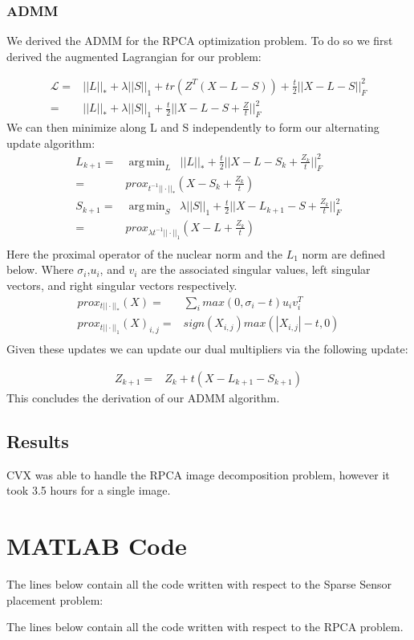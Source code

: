 \documentclass[12pt, letterpaper]{article}
\DeclareMathOperator*{\argmin}{arg\,min}
\begin{document}
	\subsubsection{ADMM}
		We derived the ADMM for the RPCA optimization problem. To do so we first derived the augmented Lagrangian for our problem:
	
	\begin{align*}
		\mathcal{L} =& ||L||_{*} + \lambda||S||_{1} +	tr(Z^T(X-L-S))+ \frac{t}{2}||X-L-S||_{F}^{2} \\
		=& ||L||_{*} + \lambda||S||_{1} +\frac{t}{2}||X-L-S +\frac{Z}{t}||_{F}^{2} 
	\end{align*}
	We can then minimize along L and S independently to form our alternating update algorithm:
	\begin{align*}
		L_{k+1} =& \argmin_{L} \;\; ||L||_{*} +\frac{t}{2}||X-L-S_{k} +\frac{Z_{k}}{t}||_{F}^{2} \\
		=& prox_{t^{-1}||\cdot||_{*}}\left(X-S_{k}+\frac{Z_{k}}{t}\right)\\
		S_{k+1} =& \argmin_{S} \;\; \lambda||S||_{1} +\frac{t}{2}||X-L_{k+1}-S +\frac{Z_{k}}{t}||_{F}^{2}  \\
		=& prox_{\lambda t^{-1}||\cdot||_{1}}\left(X-L+\frac{Z_{k}}{t} \right)\\
	\end{align*}
	Here the proximal operator of the nuclear norm and the $L_{1}$ norm are defined below. Where $\sigma_{i}$,$u_{i}$, and $v_{i}$ are the associated singular values, left singular vectors, and right singular vectors respectively.
	\begin{align*}
		prox_{t||\cdot||_{*}}(X) =& \sum_{i}max(0,\sigma_{i}-t)u_{i}v_{i}^{T} \\
		prox_{t||\cdot||_{1}}(X)_{i,j} =& sign(X_{i,j})max(|X_{i,j}|-t,0) \\
	\end{align*}
	Given these updates we can update our dual multipliers via the following update:
	
	\begin{align*}
		Z_{k+1} =& Z_{k} + t\left(X-L_{k+1}-S_{k+1}\right)
	\end{align*}
	This concludes the derivation of our ADMM algorithm.
	
	\subsection{Results}
	CVX was able to handle the RPCA image decomposition problem, however it took 3.5 hours for a single image. 	 	
	
	\nocite{*}
	
	
	
	\appendix
	\section{MATLAB Code}
	The lines below contain all the code written with respect to the Sparse Sensor placement problem:
	
	
	
	The lines below contain all the code written with respect to the RPCA problem.
	
\end{document}
